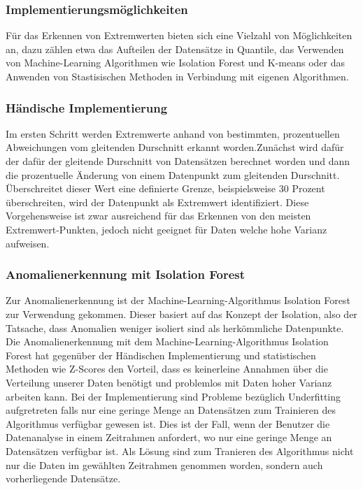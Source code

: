 \documentclass{report}
\begin{document}
\subsubsection{Implementierungsmöglichkeiten}
Für das Erkennen von Extremwerten bieten sich eine Vielzahl von Möglichkeiten an, dazu zählen etwa das Aufteilen der Datensätze in Quantile, das Verwenden von Machine-Learning Algorithmen wie Isolation Forest und K-means oder das Anwenden von Stastisischen Methoden in Verbindung mit eigenen Algorithmen. 
\subsubsection{Händische Implementierung}
Im ersten Schritt werden Extremwerte anhand von bestimmten, prozentuellen Abweichungen vom gleitenden Durschnitt erkannt worden.Zunächst wird dafür der dafür der gleitende Durschnitt von Datensätzen berechnet worden und dann die prozentuelle Änderung von einem Datenpunkt zum gleitenden Durschnitt. Überschreitet dieser Wert eine definierte Grenze, beispielsweise 30 Prozent überschreiten, wird der Datenpunkt als Extremwert identifiziert.
Diese Vorgehensweise ist zwar ausreichend für das Erkennen von den meisten Extremwert-Punkten, jedoch nicht geeignet für Daten welche hohe Varianz aufweisen. 
\subsubsection{Anomalienerkennung mit Isolation Forest}
Zur Anomalienerkennung ist der Machine-Learning-Algorithmus Isolation Forest zur Verwendung gekommen. Dieser basiert auf das Konzept der Isolation, also der Tatsache, dass Anomalien weniger isoliert sind als herkömmliche Datenpunkte. 
\citet{isolation_forest} \\
Die Anomalienerkennung mit dem Machine-Learning-Algorithmus Isolation Forest hat gegenüber der Händischen Implementierung und statistischen Methoden wie Z-Scores den Vorteil, dass es keinerleine Annahmen über die Verteilung unserer Daten benötigt und problemlos mit Daten hoher Varianz arbeiten kann.
Bei der Implementierung sind Probleme bezüglich Underfitting aufgretreten falls nur eine geringe Menge an Datensätzen zum Trainieren des Algorithmus verfügbar gewesen ist. Dies ist der Fall, wenn der Benutzer die Datenanalyse in einem Zeitrahmen anfordert, wo nur eine geringe Menge an Datensätzen verfügbar ist. Als Lösung sind zum Tranieren des Algorithmus nicht nur die Daten im gewählten Zeitrahmen genommen worden, sondern auch vorherliegende Datensätze. 
\end{document}
